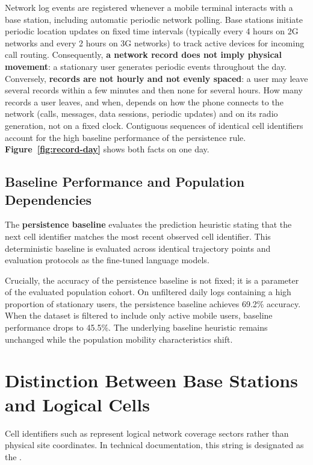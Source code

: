 Network log events are registered whenever a mobile terminal interacts with a base station, including automatic periodic network polling. Base stations initiate periodic location updates on fixed time intervals (typically every 4 hours on 2G networks and every 2 hours on 3G networks) to track active devices for incoming call routing. Consequently, \textbf{a network record does not imply physical movement}: a stationary user generates periodic events throughout the day. Conversely, \textbf{records are not hourly and not evenly spaced}: a user may leave several records within a few minutes and then none for several hours. How many records a user leaves, and when, depends on how the phone connects to the network (calls, messages, data sessions, periodic updates) and on its radio generation, not on a fixed clock. Contiguous sequences of identical cell identifiers account for the high baseline performance of the persistence rule. \textbf{Figure~\ref{fig:record-day}} shows both facts on one day.



\subsection{Baseline Performance and Population Dependencies}

The \textbf{persistence baseline} evaluates the prediction heuristic stating that the next cell identifier matches the most recent observed cell identifier. This deterministic baseline is evaluated across identical trajectory points and evaluation protocols as the fine-tuned language models.

Crucially, the accuracy of the persistence baseline is not fixed; it is a parameter of the evaluated population cohort. On unfiltered daily logs containing a high proportion of stationary users, the persistence baseline achieves 69.2\% accuracy. When the dataset is filtered to include only active mobile users, baseline performance drops to 45.5\%. The underlying baseline heuristic remains unchanged while the population mobility characteristics shift.

\section{Distinction Between Base Stations and Logical Cells}

Cell identifiers such as  represent logical network coverage sectors rather than physical site coordinates. In technical documentation, this string is designated as the \textbf{}.

